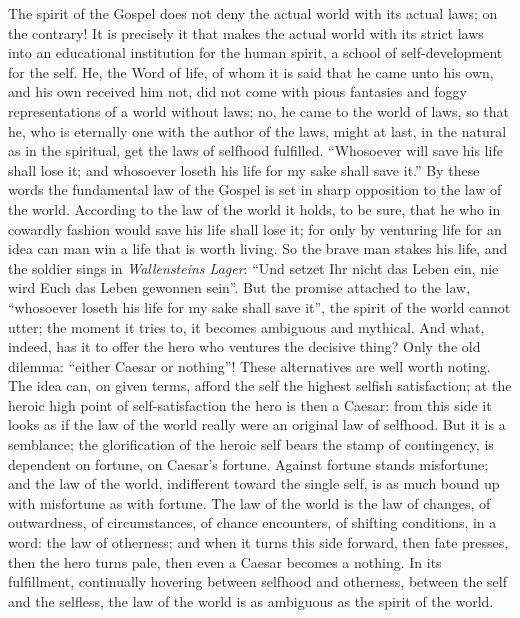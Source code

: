 \documentclass[12pt]{book}
\newcommand{\opage}[1]{\marginnote{\footnotesize\textit{[#1]}}}
\begin{document}
The spirit of the Gospel does not deny the actual world with its actual
laws; on the contrary! It is precisely it that makes the actual world
with its strict laws into an educational institution for the human
spirit, a school of self-development for the self. He, the Word of life,
of whom it is said that he came unto his own, and his own received him
not, did not come with pious fantasies and foggy representations of a
world without laws; no,
\opage{44}\setcounter{footnote}{0}%
he came to the world of laws, so that he, who is eternally one with the
author of the laws, might at last, in the natural as in the spiritual,
get the laws of selfhood fulfilled. ``Whosoever will save his life shall
lose it; and whosoever loseth his life for my sake shall save it.'' By
these words the fundamental law of the Gospel is set in sharp opposition
to the law of the world. According to the law of the world it holds,
to be sure, that he who in cowardly fashion would save his life shall
lose it; for only by venturing life for an idea can man win a life that
is worth living. So the brave man stakes his life, and the soldier sings
in \textit{Wallensteins Lager}: ``Und setzet Ihr nicht das Leben ein, nie
wird Euch das Leben gewonnen sein''. But the promise attached to the law,
``whosoever loseth his life for my sake shall save it'', the spirit of
the world cannot utter; the moment it tries to, it becomes ambiguous and
mythical. And what, indeed, has it to offer the hero who ventures the
decisive thing? Only the old dilemma: ``either Caesar or nothing''! These
alternatives are well worth noting. The idea can, on given terms, afford
the self the highest selfish satisfaction; at the heroic high point of
self-satisfaction the hero is then a Caesar: from this side it looks as
if the law of the world really were an original law of selfhood. But it
is a semblance; the glorification of the heroic self bears the stamp of
contingency, is dependent on fortune, on Caesar's fortune. Against
fortune stands misfortune; and the law of the world, indifferent toward
the single self, is as much bound up with misfortune as with fortune.
The law of the world is the law of changes, of outwardness, of
circumstances, of chance encounters, of shifting conditions, in a word:
the law of otherness; and when it turns this side forward, then fate
presses, then the hero turns pale, then even a Caesar becomes a nothing.
In its
\opage{45}\setcounter{footnote}{0}%
fulfillment, continually hovering between selfhood and otherness, between
the self and the selfless, the law of the world is as ambiguous as the
spirit of the world.
\end{document}

